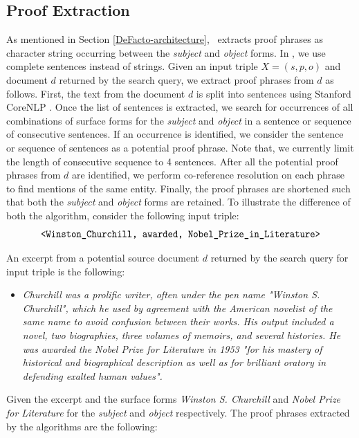 \subsection{Proof Extraction}
As mentioned in Section \ref{DeFacto-architecture}, \DeFacto\ extracts proof phrases as character string occurring between the \textit{subject} and \textit{object} forms. In \FactCheck, we use complete sentences instead of strings. Given an input triple $X = (s, p, o)$ and document $d$ returned by the search query, we extract proof phrases from $d$ as follows. First, the text from the document $d$ is split into sentences using Stanford CoreNLP \cite{manning2014stanford}. Once the list of sentences is extracted, we search for occurrences of all combinations of surface forms \cite{mendes2011dbpedia} for the \textit{subject} and \textit{object} in a sentence or sequence of consecutive sentences. If an occurrence is identified, we consider the sentence or sequence of sentences as a potential proof phrase. Note that, we currently limit the length of consecutive sequence to 4 sentences. After all the potential proof phrases from $d$ are identified, we perform co-reference resolution on each phrase to find mentions of the same entity. Finally, the proof phrases are shortened such that both the \textit{subject} and \textit{object} forms are retained. To illustrate the difference of both the algorithm, consider the following input triple:
\begin{equation*}
\text{\texttt{<Winston\_Churchill, awarded, Nobel\_Prize\_in\_Literature>}}
\end{equation*}

An excerpt from a potential source document $d$ returned by the search query for input triple is the following:

\begin{itemize}
\item[]\textit{Churchill was a prolific writer, often under the pen name "Winston S. Churchill", which he used by agreement with the American novelist of the same name to avoid confusion between their works. His output included a novel, two biographies, three volumes of memoirs, and several histories. He was awarded the Nobel Prize for Literature in 1953 "for his mastery of historical and biographical description as well as for brilliant oratory in defending exalted human values".}
\end{itemize}

Given the excerpt and the surface forms \textit{Winston S. Churchill} and \textit{Nobel Prize for Literature} for the \textit{subject} and \textit{object} respectively. The proof phrases extracted by the algorithms are the following:

